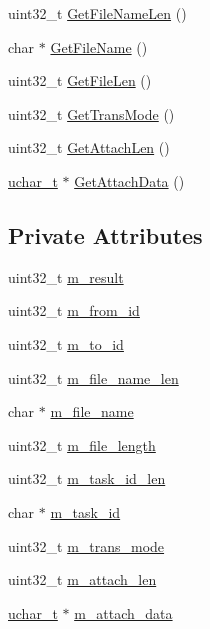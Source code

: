 \begin{DoxyCompactItemize}
uint32\+\_\+t \hyperlink{class_c_im_pdu_msg_file_transfer_rsp_a09072182548a3a3d16c61ef7fe602bc3}{Get\+File\+Name\+Len} ()
\item 
char $\ast$ \hyperlink{class_c_im_pdu_msg_file_transfer_rsp_a5d957d10840bd43f42d09a2a0f332868}{Get\+File\+Name} ()
\item 
uint32\+\_\+t \hyperlink{class_c_im_pdu_msg_file_transfer_rsp_ab4c6a6976b99e1d8a20df6115f16d499}{Get\+File\+Len} ()
\item 
uint32\+\_\+t \hyperlink{class_c_im_pdu_msg_file_transfer_rsp_a4da05e93ee4b471ea0b67dfad3e99a84}{Get\+Trans\+Mode} ()
\item 
uint32\+\_\+t \hyperlink{class_c_im_pdu_msg_file_transfer_rsp_aec55f98e03f280d589ef1b9c93440c99}{Get\+Attach\+Len} ()
\item 
\hyperlink{base_2ostype_8h_a124ea0f8f4a23a0a286b5582137f0b8d}{uchar\+\_\+t} $\ast$ \hyperlink{class_c_im_pdu_msg_file_transfer_rsp_a7976e43168b78cc9faafc653bfa61917}{Get\+Attach\+Data} ()
\end{DoxyCompactItemize}
\subsection*{Private Attributes}
\begin{DoxyCompactItemize}
\item 
uint32\+\_\+t \hyperlink{class_c_im_pdu_msg_file_transfer_rsp_a6425adc76991b09bf542df6f639a854b}{m\+\_\+result}
\item 
uint32\+\_\+t \hyperlink{class_c_im_pdu_msg_file_transfer_rsp_adf1617694970b8ab9b304a7cb50f1dbc}{m\+\_\+from\+\_\+id}
\item 
uint32\+\_\+t \hyperlink{class_c_im_pdu_msg_file_transfer_rsp_a71ae9df03f80e9759e1cc6ec4d09fbe0}{m\+\_\+to\+\_\+id}
\item 
uint32\+\_\+t \hyperlink{class_c_im_pdu_msg_file_transfer_rsp_a5291ec5b384521bd5a831b03cc4d0809}{m\+\_\+file\+\_\+name\+\_\+len}
\item 
char $\ast$ \hyperlink{class_c_im_pdu_msg_file_transfer_rsp_afb7dd0e3c7fd6442baf8d6d296aece70}{m\+\_\+file\+\_\+name}
\item 
uint32\+\_\+t \hyperlink{class_c_im_pdu_msg_file_transfer_rsp_a6634d96c9a409547f06d72a339d88045}{m\+\_\+file\+\_\+length}
\item 
uint32\+\_\+t \hyperlink{class_c_im_pdu_msg_file_transfer_rsp_a487ee58f6055503ae6f14616c009b00c}{m\+\_\+task\+\_\+id\+\_\+len}
\item 
char $\ast$ \hyperlink{class_c_im_pdu_msg_file_transfer_rsp_ae279a5abd252876cd001d9b0f485327a}{m\+\_\+task\+\_\+id}
\item 
uint32\+\_\+t \hyperlink{class_c_im_pdu_msg_file_transfer_rsp_a7103a3f2b6ed8f3a7e028959a82d186d}{m\+\_\+trans\+\_\+mode}
\item 
uint32\+\_\+t \hyperlink{class_c_im_pdu_msg_file_transfer_rsp_a343e9d4701f5b546efb09a0298c697a6}{m\+\_\+attach\+\_\+len}
\item 
\hyperlink{base_2ostype_8h_a124ea0f8f4a23a0a286b5582137f0b8d}{uchar\+\_\+t} $\ast$ \hyperlink{class_c_im_pdu_msg_file_transfer_rsp_a0714acb575dcd22d70437041c1760238}{m\+\_\+attach\+\_\+data}
\end{DoxyCompactItemize}
